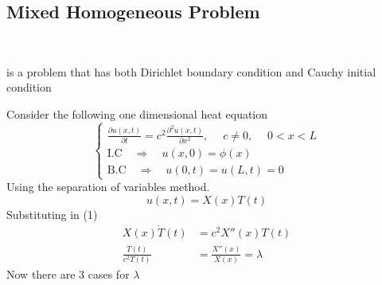 \documentclass[]{article}
\begin{document}
\subsection{Mixed Homogeneous Problem}
\ 
\begin{definition}
    is a problem that has both Dirichlet boundary condition and Cauchy initial condition
\end{definition}
Consider the following one dimensional heat equation 
\begin{equation}
    \begin{cases}
        \displaystyle \frac{\partial u(x,t)}{\partial t} = c^2\frac{\partial^2 u(x,t)}{\partial x^2}, \quad\; c\neq0, \quad\; 0<x<L
        \\
        \text{I.C} \quad \Longrightarrow \quad u(x,0) = \phi(x)
        \\
        \text{B.C} \quad \Longrightarrow \quad u(0,t) = u(L,t) = 0
    \end{cases}
\end{equation}
Using the separation of variables method.
\begin{equation}
u(x,t) = X(x)T(t)
\end{equation}
Substituting in (1)
\begin{align*}
X(x)\dot{T}(t) &= c^2 X''(x)T(t)
\\
\frac{\dot{T}(t)}{c^2 T(t)} &= \frac{X''(x)}{X(x)} = \lambda
\end{align*}
Now there are 3 cases for $\lambda$
\end{document}
